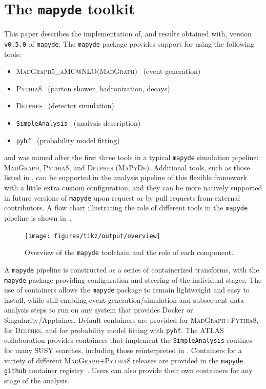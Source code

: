 \documentclass{article}
\makeatletter
\newcommand{\mapyde}{\texttt{mapyde}}
\newcommand{\simpleanalysis}{\texttt{SimpleAnalysis}}
\newcommand{\madgraph}{\textsc{MadGraph}}
\newcommand{\madgraphfull}{\textsc{MadGraph5\_aMC@NLO}}
\newcommand{\pythia}{\textsc{Pythia8}}
\newcommand{\delphes}{\textsc{Delphes}}
\newcommand{\pyhf}{\texttt{pyhf}}
\makeatother
\begin{document}
\section{The \mapyde{} toolkit}
\label{sec:the-toolkit}

This paper describes the implementation of, and results obtained with, version \texttt{v0.5.0} of \mapyde.  The \mapyde{} package provides support for using the following tools:

\begin{itemize}
	\item \madgraphfull (\madgraph)~\cite{Alwall:2014hca,Frederix:2018nkq} (event generation)
	\item \pythia~\cite{Bierlich:2022pfr} (parton shower, hadronization, decays)
	\item \delphes~\cite{deFavereau:2013fsa,Selvaggi:2014mya,Mertens:2015kba} (detector simulation)
	\item \simpleanalysis~\cite{simpleanalysis,atlas_simpleanalysis} (analysis description)
	\item \pyhf~\cite{pyhf,pyhf_joss} (probability model fitting)
\end{itemize}

and was named after the first three tools in a typical \mapyde{} simulation pipeline: \madgraph, \pythia, and \delphes{} (\textsc{MaPyDe}).  Additional tools, such as those listed in , can be supported in the analysis pipeline of this flexible framework with a little extra custom configuration, and they can be more natively supported in future versions of \mapyde{} upon request or by pull requests from external contributors.  A flow chart illustrating the role of different tools in the \mapyde{} pipeline is shown in~.

\begin{figure}[tbp]
	\centering
	\texttt{[image: figures/tikz/output/overview]}
	\caption{Overview of the \mapyde{} toolchain and the role of each component.}
	\label{fig:mapydeoverview}
\end{figure}

A \mapyde{} pipeline is constructed as a series of containerized transforms, with the \mapyde{} package providing configuration and steering of the individual stages.  The use of containers allows the \mapyde{} package to remain lightweight and easy to install, while still enabling event generation/simulation and subsequent data analysis steps to run on any system that provides Docker or Singularity/Apptainer.  Default containers are provided for \madgraph+\pythia, for \delphes, and for probability model fitting with \pyhf.  The ATLAS collaboration provides containers that implement the \simpleanalysis{} routines for many SUSY searches, including those reinterpreted in .  Containers for a variety of different \madgraph+\pythia{} releases are provided in the \mapyde{} \texttt{github} container registry~\cite{MapydeRegistry}.  Users can also provide their own containers for any stage of the analysis.
\end{document}
